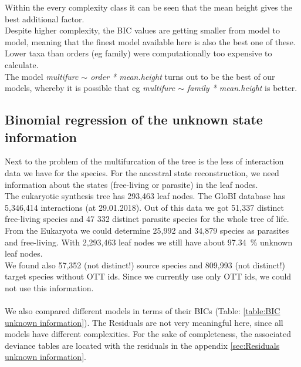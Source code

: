       Within the every complexity class it can be seen that the mean height gives the best additional factor. \\
      Despite higher complexity, the BIC values are getting smaller from model to model, meaning that 
        the finest model available here is also the best one of these. Lower taxa than orders (eg 
        family) were computationally too expensive to calculate. \\
      The model \textit{multifurc $\sim$ order * mean.height} turns out to be the best of our models, 
        whereby it is possible that eg \textit{multifurc $\sim$ family * mean.height} is better.

    \subsection{Binomial regression of the unknown state information}

      Next to the problem of the multifurcation of the tree is the less of interaction data we have for 
        the species. For the ancestral state reconstruction, we need information about the states 
        (free-living or parasite) in the leaf nodes. \\
      The eukaryotic synthesis tree has 293,463 leaf nodes. The GloBI database has 5,346,414 interactions 
        (at 29.01.2018). Out of this data we got 51,337 distinct free-living species and 47 332 
        distinct parasite species for the whole tree of life. From the Eukaryota we could determine 
        25,992 and 34,879 species as parasites and free-living. With 2,293,463 leaf nodes we still have 
        about 97.34~\% unknown leaf nodes. \\
      We found also 57,352 (not distinct!) source species and 809,993 (not distinct!) target
        species without OTT ids. Since we currently use only OTT ids, we could not use this information. \\        
       \\

      We also compared different models in terms of their BICs (Table: \ref{table:BIC unknown information}). 
        The Residuals are not very meaningful here, since all models have different complexities. %
        For the sake of completeness, the associated deviance tables are located with the residuals in 
        the appendix \ref{sec:Residuals unknown information}.

